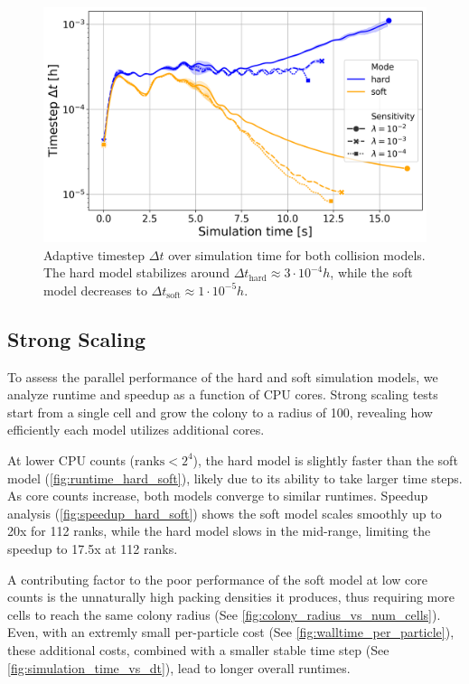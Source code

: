 \documentclass[conference]{IEEEtran}
\begin{document}
\begin{figure}[H]
    \centering
    \includegraphics[width=\linewidth]{figures/comparison_plots/combined_simulation_time [s]_vs_dt.png}
    \caption{Adaptive timestep $\Delta t$ over simulation time for both collision models. The hard model stabilizes around ${\Delta t}_{\text{hard}} \approx 3 \cdot 10^{-4} h$, while the soft model decreases to ${\Delta t}_{\text{soft}} \approx 1 \cdot 10^{-5} h$.} \label{fig:simulation_time_vs_dt}
\end{figure}


\subsection{Strong Scaling}
\label{sec:strong_scaling}

To assess the parallel performance of the hard and soft simulation models, we analyze runtime and speedup as a function of CPU cores. Strong scaling tests start from a single cell and grow the colony to a radius of 100, revealing how efficiently each model utilizes additional cores.

At lower CPU counts ($\text{ranks}< 2^4$), the hard model is slightly faster than the soft model (\autoref{fig:runtime_hard_soft}), likely due to its ability to take larger time steps. As core counts increase, both models converge to similar runtimes. Speedup analysis (\autoref{fig:speedup_hard_soft}) shows the soft model scales smoothly up to 20x for 112 ranks, while the hard model slows in the mid-range, limiting the speedup to 17.5x at 112 ranks.

A contributing factor to the poor performance of the soft model at low core counts is the unnaturally high packing densities it produces, thus requiring more cells to reach the same colony radius (See \autoref{fig:colony_radius_vs_num_cells}). Even, with an extremly small per-particle cost (See \autoref{fig:walltime_per_particle}), these additional costs, combined with a smaller stable time step (See \autoref{fig:simulation_time_vs_dt}), lead to longer overall runtimes.
\end{document}
